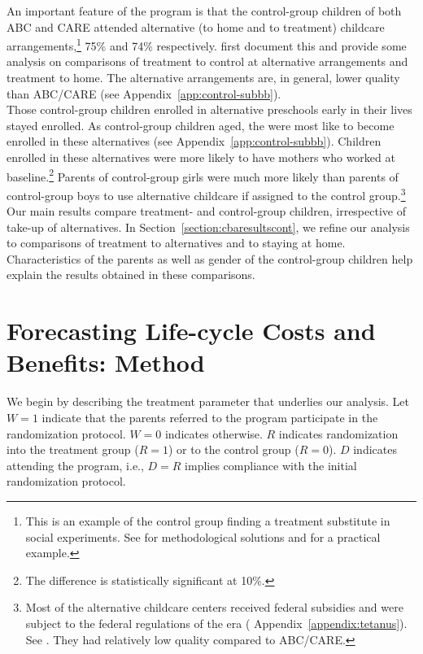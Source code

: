 \noindent An important feature of the program is that the control-group children of both ABC and CARE attended alternative (to home and to treatment) childcare arrangements,\footnote{This is an example of the control group finding a treatment substitute in social experiments. See \cite{Heckman_Hohmann_etal_2000_QJE} for methodological solutions and for a practical example.} 75\% and 74\% respectively. \citet{Burchinal_Campbell_etal_1997_CD} first document this and provide some analysis on comparisons of treatment to control at alternative arrangements and treatment to home. The alternative arrangements are, in general, lower quality than ABC/CARE (see  Appendix~\ref{app:control-subbb}).\\

\noindent Those control-group children enrolled in alternative preschools early in their lives stayed enrolled. As control-group children aged, the were most like to become enrolled in these alternatives (see  Appendix~\ref{app:control-subbb}). Children enrolled in these alternatives were more likely to have mothers who worked at baseline.\footnote{The difference is statistically significant at 10\%.} Parents of control-group girls were much more likely than parents of control-group boys to use alternative childcare if assigned to the control group.\footnote{Most of the alternative childcare centers received federal subsidies and were subject to the federal regulations of the era ( Appendix~\ref{appendix:tetanus}). See \citet{Department-of-Health_1968_DayCareRequirements,NCGA_1971_House-Bill-100,Ramey-et-al_1977_Intro-to-ABC,Ramey_Campbell_1979_SR,Ramey_McGinness_etal_1982_Abecedarianapproach, Burchinal_Campbell_etal_1997_CD}. They had relatively low quality compared to ABC/CARE.} Our main results compare treatment- and control-group children, irrespective of take-up of alternatives. In Section~\ref{section:cbaresultscont}, we refine our analysis to comparisons of treatment to alternatives and to staying at home. Characteristics of the parents as well as gender of the control-group children help explain the results obtained in these comparisons.

\section{Forecasting Life-cycle Costs and Benefits: Method} \label{section:cbamethodology}

\noindent We begin by describing the treatment parameter that underlies our analysis. Let $W=1$ indicate that the parents referred to the program participate in the randomization protocol. $W=0$ indicates otherwise. $R$ indicates randomization into the treatment group ($R = 1$) or to the control group ($R = 0$). $D$ indicates attending the program, i.e., $D = R$ implies compliance with the initial randomization protocol.\\

